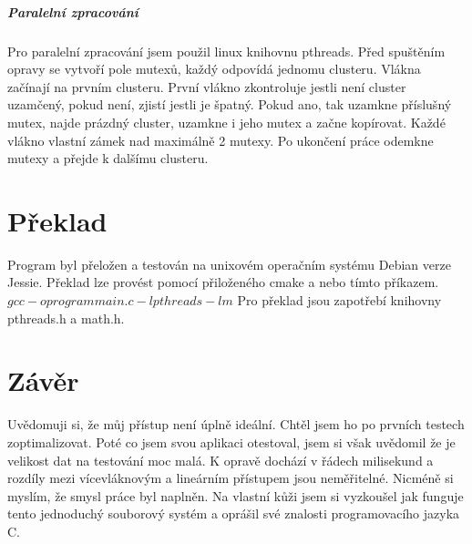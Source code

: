 \documentclass[12pt, a4paper]{article}
\begin{document}
\subparagraph{Paralelní zpracování}
Pro paralelní zpracování jsem použil linux knihovnu pthreads. Před spuštěním opravy se vytvoří pole mutexů, každý odpovídá jednomu clusteru. Vlákna začínají na prvním clusteru. První vlákno zkontroluje jestli není cluster uzamčený, pokud není, zjistí jestli je špatný. Pokud ano, tak uzamkne příslušný mutex, najde prázdný cluster, uzamkne i jeho mutex a začne kopírovat. Každé vlákno vlastní zámek nad maximálně 2 mutexy. Po ukončení práce odemkne mutexy a přejde k dalšímu clusteru.
\section{Překlad}
Program byl přeložen a testován na unixovém operačním systému Debian verze Jessie. Překlad lze provést pomocí přiloženého cmake a nebo tímto příkazem. $gcc -o program main.c -lpthreads -lm $ Pro překlad jsou zapotřebí knihovny pthreads.h a math.h. 
\section{Závěr}
Uvědomuji si, že můj přístup není úplně ideální. Chtěl jsem ho po prvních testech zoptimalizovat. Poté co jsem svou aplikaci otestoval, jsem si však uvědomil že je velikost dat na testování moc malá. K opravě dochází v řádech milisekund a rozdíly mezi vícevláknovým a lineárním přístupem jsou neměřitelné. Nicméně si myslím, že smysl práce byl naplněn. Na vlastní kůži jsem si vyzkoušel jak funguje tento jednoduchý souborový systém a oprášil své znalosti programovacího jazyka C. 
\end{document}
